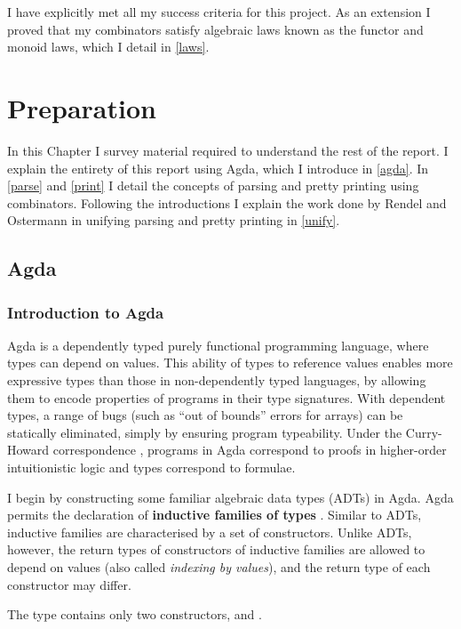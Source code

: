 \documentclass[12pt,a4paper,twoside,openright]{report}
\newcommand{\C}{\AgdaInductiveConstructor}
\newcommand{\F}{\AgdaFunction}
\begin{document}
I have explicitly met all my success criteria for this project.
As an extension I proved that my combinators satisfy algebraic laws known as the functor and monoid laws, which I detail in \autoref{laws}.

\chapter{Preparation} \label{chap2}
\vspace{-1em}
In this Chapter I survey material required to understand the rest of the report.  
I explain the entirety of this report using Agda, which I introduce in \autoref{agda}. In \autoref{parse} and \autoref{print} I detail the concepts of parsing and pretty printing using combinators. Following the introductions I explain the work done by Rendel and Ostermann in unifying parsing and pretty printing in \autoref{unify}.

\section{Agda} \label{agda}

\subsection{Introduction to Agda}

Agda \cite{agda} is a dependently typed purely functional programming language, where types can depend on values. This ability of types to reference values enables more expressive types than those in non-dependently typed languages, by allowing them to encode properties of programs in their type signatures. With dependent types, a range of bugs (such as ``out of bounds'' errors for arrays) can be statically eliminated, simply by ensuring program typeability.  
Under the Curry-Howard correspondence \cite{curry-how}, programs in Agda correspond to proofs in higher-order intuitionistic logic and types correspond to formulae. 

I begin by constructing some familiar algebraic data types (ADTs) in Agda. Agda permits the declaration of {\bf inductive families of types} \cite{idt}. Similar to ADTs, inductive families are characterised by a set of constructors. Unlike ADTs, however, the return types of constructors of inductive families are allowed to depend on values (also called \emph{indexing by values}), and the return type of each constructor may differ.

The type \F{Bool} contains only two constructors, \C{true} and \C{false}.
\end{document}
